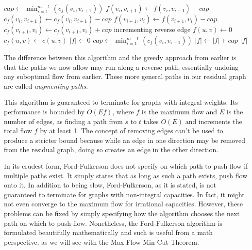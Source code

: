 \begin{algorithm}[H]
\caption{Ford-Fulkerson}
\begin{algorithmic}
\State $cap \gets \min_{i=1}^{m-1}(c_f(v_i,v_{i+1}))$
	\State $f(v_i,v_{i+1}) \gets f(v_i,v_{i+1}) + cap$
	\State $c_f(v_i,v_{i+1}) \gets c_f(v_i,v_{i+1}) - cap$
	\State $f(v_{i+1},v_i) \gets f(v_{i+1},v_i) - cap$
	\State $c_f(v_{i+1},v_i) \gets c_f(v_{i+1},v_i) + cap$
	\Comment incrementing reverse edge
\EndFor
\EndFunction
{}
		\State $f(u,v) \gets 0$
		\State $c_f(u,v) \gets c(u,v)$
	\EndFor
	\State $|f| \gets 0$
		\State $cap \gets \min_{i=1}^{m-1}(c_f(v_i,v_{i+1}))$
		\State $|f| \gets |f| + cap$
		\State {}
	\EndWhile
	\Return $|f|$
\EndFunction
\end{algorithmic}
\end{algorithm}

The difference between this algorithm and the greedy approach from earlier is that the paths we now allow may run along a reverse path, essentially undoing any suboptimal flow from earlier. These more general paths in our residual graph are called \textit{augmenting paths}.

This algorithm is guaranteed to terminate for graphs with integral weights. Its performance is bounded by $O(Ef)$, where $f$ is the maximum flow and $E$ is the number of edges, as finding a path from $s$ to $t$ takes $O(E)$ and increments the total flow $f$ by at least 1. The concept of removing edges can't be used to produce a stricter bound because while an edge in one direction may be removed from the residual graph, doing so creates an edge in the other direction.

In its crudest form, Ford-Fulkerson does not specify on which path to push flow if multiple paths exist. It simply states that as long as such a path exists, push flow onto it. In addition to being slow, Ford-Fulkerson, as it is stated, is not guaranteed to terminate for graphs with non-integral capacities. In fact, it might not even converge to the maximum flow for irrational capacities. However, these problems can be fixed by simply specifying how the algorithm chooses the next path on which to push flow. Nonetheless, the Ford-Fulkerson algorithm is formulated beautifully mathematically and such is useful from a math perspective, as we will see with the Max-Flow Min-Cut Theorem.

